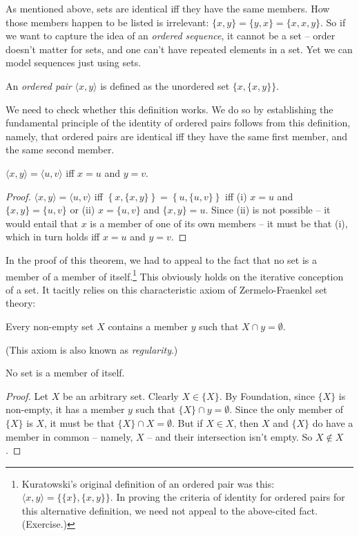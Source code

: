 As mentioned above, sets are identical iff they have the same members. How those members happen to be listed is irrelevant: $\{x,y\}=\{y,x\}=\{x,x,y\}$. So if we want to capture the idea of an \emph{ordered sequence}, it cannot be a set – order doesn't matter for sets, and one can't have repeated elements in a set. Yet we can model sequences just using sets.
\begin{definition} An {\em ordered pair} $\langle x, y \rangle$ is defined as the unordered set $\bigl\{x,\{x,y\}\bigr\}$.
\end{definition}
We need to check whether this definition works. We do so by establishing the fundamental principle of the identity of ordered pairs follows from this definition, namely, that ordered pairs are identical iff they have the same first member, and the same second member.
\begin{theorem}\label{cridorpa}
$\langle x,y\rangle = \langle u,v\rangle$ iff $x=u$ and $y=v$.
\begin{proof}
	$\langle x,y\rangle = \langle u,v\rangle$ iff $\left\{x,\{x,y\}\right\} = \left\{u,\{u,v\}\right\}$ iff (i) $x=u$ and $\{x,y\} = \{u,v\}$ or (ii) $x=\{u,v\}$ and $\{x,y\}=u$. Since (ii) is not possible – it would entail that $x$ is a member of one of its own members – it must be that (i), which in turn holds iff $x=u$ and $y=v$.
\end{proof}
\end{theorem}
In the proof of this theorem, we had to appeal to the fact that no set is a member of a member of itself.\footnote{Kuratowski's original definition of an ordered pair was this: $\langle x,y\rangle = \{\{x\},\{x,y\}\}$. In proving the criteria of identity for ordered pairs for this alternative definition, we need not appeal to the above-cited fact. (Exercise.)} This obviously holds on the iterative conception of a set. It tacitly relies on this characteristic axiom of Zermelo-Fraenkel set theory: \begin{axiom}[Foundation]
	 Every non-empty set $X$ contains a member $y$  such that $X \cap y = \emptyset$.
\end{axiom} (This axiom is also known as \emph{regularity}.) \begin{theorem}
	No set is a member of itself. \begin{proof}
		Let $X$ be an arbitrary set. Clearly $X \in \{X\}$. By Foundation, since $\{X\}$ is non-empty, it has a member $y$ such that $\{X\} \cap y = \emptyset$. Since the only member of $\{X\}$ is $X$, it must be that $\{X\} \cap X = \emptyset$. But if $X\in X$, then $X$ and $\{X\}$ do have a member in common – namely, $X$ – and their intersection isn't empty. So $X \notin X$.
	\end{proof} 
\end{theorem}

